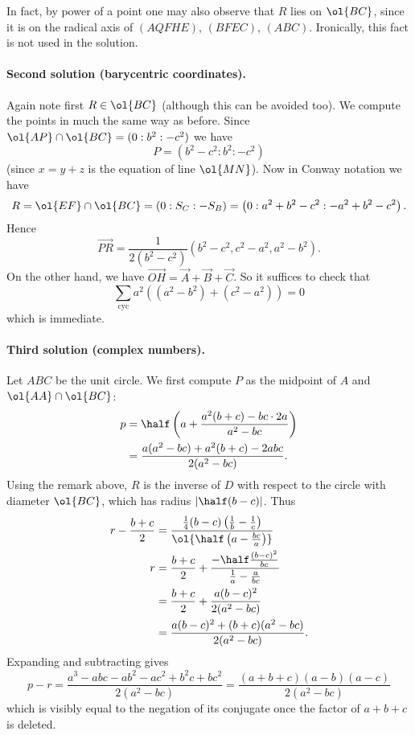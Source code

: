 \begin{remark*}
  In fact, by power of a point one may also observe
  that $R$ lies on $\ol{BC}$,
  since it is on the radical axis of $(AQFHE)$, $(BFEC)$, $(ABC)$.
  Ironically, this fact is not used in the solution.
\end{remark*}

\paragraph{Second solution (barycentric coordinates).}
Again note first $R \in \ol{BC}$ (although this can be avoided too).
We compute the points in much the same way as before.
Since $\ol{AP} \cap \ol{BC} = (0 : b^2 : -c^2)$
we have \[ P = \left( b^2-c^2 : b^2 : -c^2  \right) \]
(since $x=y+z$ is the equation of line $\ol{MN}$).
Now in Conway notation we have
\[ R = \ol{EF} \cap \ol{BC} = (0 : S_C : -S_B)
  =\left( 0 : a^2+b^2-c^2 : -a^2+b^2-c^2 \right). \]
Hence
\[ \overrightarrow{PR}
  = \frac{1}{2(b^2-c^2)} \left( b^2-c^2 , c^2-a^2 , a^2-b^2 \right).  \]
On the other hand, we have
$\overrightarrow{OH} = \vec A + \vec B + \vec C$.
So it suffices to check that
\[ \sum_{\text{cyc}} a^2\left( (a^2-b^2) + (c^2-a^2) \right) = 0 \]
which is immediate.

\paragraph{Third solution (complex numbers).}
Let $ABC$ be the unit circle.
We first compute $P$ as the midpoint of $A$ and $\ol{AA} \cap \ol{BC}$:
\begin{align*}
  p &= \half \left( a + \frac{a^2(b+c)-bc\cdot2a}{a^2-bc} \right) \\
  &= \frac{a(a^2-bc)+a^2(b+c)-2abc}{2(a^2-bc)}.
\end{align*}
Using the remark above, $R$ is the inverse of $D$ with
respect to the circle with diameter $\ol{BC}$,
which has radius $\left\lvert \half(b-c) \right\rvert$.
Thus
\begin{align*}
  r - \frac{b+c}{2}
  &= \frac{\frac14(b-c)\left( \frac1b-\frac1c \right)}%
  {\ol{\half\left( a-\frac{bc}{a} \right)}} \\
  r &= \frac{b+c}{2}
  + \frac{-\half \frac{(b-c)^2}{bc}}{\frac1a-\frac{a}{bc}} \\
  &= \frac{b+c}{2} + \frac{a(b-c)^2}{2(a^2-bc)} \\
  &= \frac{a(b-c)^2+(b+c)(a^2-bc)}{2(a^2-bc)}.
\end{align*}
Expanding and subtracting gives
\[ p-r = \frac{a^3-abc-ab^2-ac^2+b^2c+bc^2}{2(a^2-bc)}
  = \frac{(a+b+c)(a-b)(a-c)}{2(a^2-bc)} \]
which is visibly equal to the negation of its conjugate
once the factor of $a+b+c$ is deleted.

